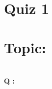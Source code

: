 \documentclass{elsarticle}
\begin{document}
\section{Quiz 1}
\section{Topic:  }
\\
\textbf{Q : }


\begin{verbatim}

\end{verbatim}

 \\
 \\
\end{document}
